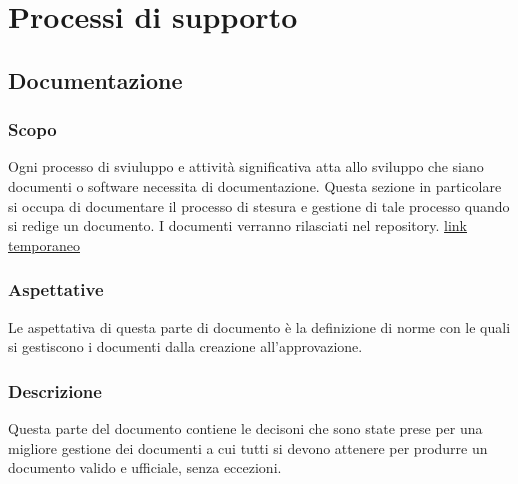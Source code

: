 \section{Processi di supporto}
  \subsection{Documentazione}

  \subsubsection{Scopo}
  Ogni processo di sviuluppo e attivit\`a significativa atta allo sviluppo che siano documenti o software necessita di documentazione.
  Questa sezione in particolare si occupa di documentare il processo di stesura e gestione di tale processo quando si redige un documento.
  I documenti verranno rilasciati nel repository\glo.
  \href{https://github.com/Jatus93/sweDocs}{link temporaneo}

  \subsubsection{Aspettative}
  Le aspettativa di questa parte di documento \`e la definizione di norme con le
  quali si gestiscono i documenti dalla creazione all'approvazione.

  \subsubsection{Descrizione}
  Questa parte del documento contiene le decisoni che sono state prese per una
  migliore gestione dei documenti a cui tutti si devono attenere per produrre un
  documento valido e ufficiale, senza eccezioni.

